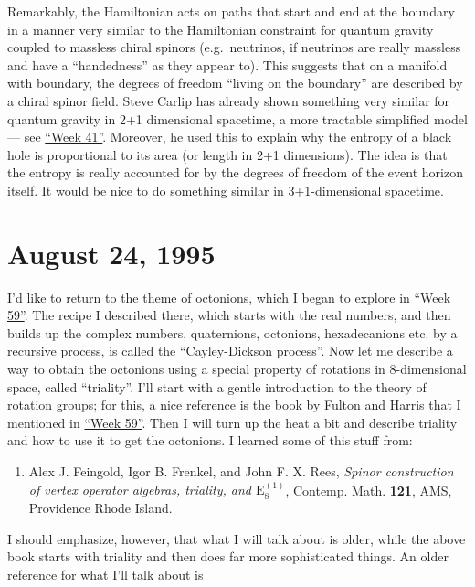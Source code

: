 \documentclass{article}
\def\tightlist{}
\begin{document}
Remarkably, the Hamiltonian acts on paths that start and end at the
boundary in a manner very similar to the Hamiltonian constraint for
quantum gravity coupled to massless chiral spinors (e.g.~neutrinos, if
neutrinos are really massless and have a ``handedness'' as they appear
to). This suggests that on a manifold with boundary, the degrees of
freedom ``living on the boundary'' are described by a chiral spinor
field. Steve Carlip has already shown something very similar for quantum
gravity in 2+1 dimensional spacetime, a more tractable simplified model
--- see \protect\hyperlink{week41}{``Week 41''}. Moreover, he used this
to explain why the entropy of a black hole is proportional to its area
(or length in 2+1 dimensions). The idea is that the entropy is really
accounted for by the degrees of freedom of the event horizon itself. It
would be nice to do something similar in 3+1-dimensional spacetime.



\hypertarget{week61}{%
\section{August 24, 1995}\label{week61}}

I'd like to return to the theme of octonions, which I began to explore
in \protect\hyperlink{week59}{``Week 59''}. The recipe I described
there, which starts with the real numbers, and then builds up the
complex numbers, quaternions, octonions, hexadecanions etc. by a
recursive process, is called the ``Cayley-Dickson process''. Now let me
describe a way to obtain the octonions using a special property of
rotations in 8-dimensional space, called ``triality''. I'll start with a
gentle introduction to the theory of rotation groups; for this, a nice
reference is the book by Fulton and Harris that I mentioned in
\protect\hyperlink{week59}{``Week 59''}. Then I will turn up the heat a
bit and describe triality and how to use it to get the octonions. I
learned some of this stuff from:

\begin{enumerate}
\def\labelenumi{\arabic{enumi})}
\tightlist
\item
  Alex J. Feingold, Igor B. Frenkel, and John F. X. Rees, \emph{Spinor
  construction of vertex operator algebras, triality, and
  \(\mathrm{E}_8^{(1)}\)}, Contemp. Math. \textbf{121}, AMS, Providence
  Rhode Island.
\end{enumerate}

I should emphasize, however, that what I will talk about is older, while
the above book starts with triality and then does far more sophisticated
things. An older reference for what I'll talk about is
\end{document}
